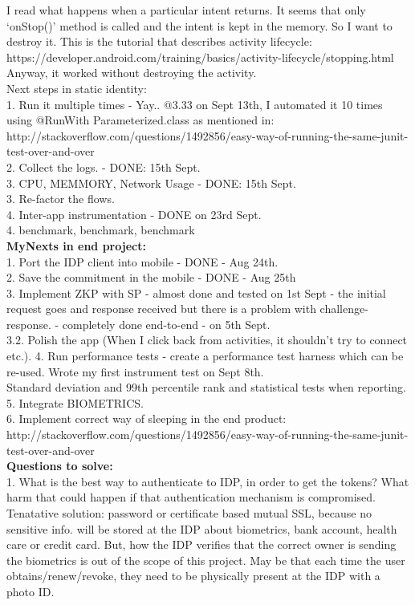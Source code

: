 \documentclass[11pt]{article}
\begin{document}
I read what happens when a particular intent returns. It seems that only `onStop()' method is called and the intent is kept in the memory. So I want 
to destroy it. This is the tutorial that describes activity lifecycle: 
https://developer.android.com/training/basics/activity-lifecycle/stopping.html\\

Anyway, it worked without destroying the activity.\\

Next steps in static identity:\\
1. Run it multiple times - Yay.. @3.33 on Sept 13th, I automated it 10 times using @RunWith Parameterized.class as mentioned in: 
http://stackoverflow.com/questions/1492856/easy-way-of-running-the-same-junit-test-over-and-over\\
2. Collect the logs. - DONE: 15th Sept.\\
3. CPU, MEMMORY, Network Usage - DONE: 15th Sept.\\
3. Re-factor the flows.\\
4. Inter-app instrumentation - DONE on 23rd Sept.\\
4. benchmark, benchmark, benchmark\\


\textbf{MyNexts in end project:}\\
 1. Port the IDP client into mobile - DONE - Aug 24th.\\
 2. Save the commitment in the mobile - DONE - Aug 25th\\
 3. Implement ZKP with SP - almost done and tested on 1st Sept - the initial request goes and response received but there is a problem with 
challenge-response. - completely done end-to-end - on 5th Sept.\\
3.2. Polish the app (When I click back from activities, it shouldn't try to connect etc.).
 4. Run performance tests - create a performance test harness which can be re-used. Wrote my first instrument test on Sept 8th.\\
 Standard deviation and 99th percentile rank and statistical tests when reporting.\\
 5. Integrate BIOMETRICS.\\
 6. Implement correct way of sleeping in the end product: 
http://stackoverflow.com/questions/1492856/easy-way-of-running-the-same-junit-test-over-and-over\\

\textbf{Questions to solve:}\\
 1. What is the best way to authenticate to IDP, in order to get the tokens? What harm that could happen if that authentication mechanism is 
compromised.\\
Tenatative solution: password or certificate based mutual SSL, because no sensitive info. will be stored at the IDP about biometrics, bank account, 
health care or credit card. But, how the IDP verifies that the correct owner is sending the biometrics is out of the scope of this project.
May be that each time the user obtains/renew/revoke, they need to be physically present at the IDP with a photo ID. \\
\end{document}

